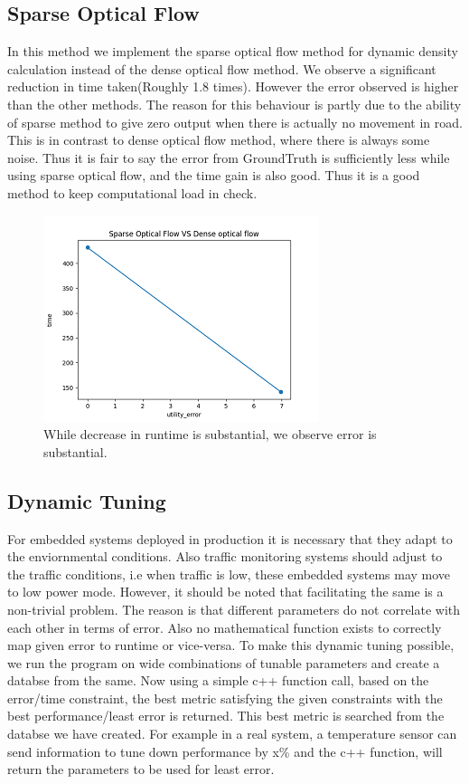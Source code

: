 \documentclass[conference]{IEEEtran}
\begin{document}
\subsection{Sparse Optical Flow}

In this method we implement the sparse optical flow method for dynamic density calculation instead of the dense optical flow method.
We observe a significant reduction in time taken(Roughly 1.8 times). However the error observed is higher than the other methods.
The reason for this behaviour is partly due to the ability of sparse method to give zero output when there is actually no movement in road. This is in contrast to dense optical flow method,
where there is always some noise. Thus it is fair to say the error from GroundTruth is sufficiently less while using sparse optical flow, and the time gain is also good. Thus it is a good method to keep computational load in check.

\begin{figure}[htbp]
\centerline{\includegraphics{plots/plot_sparse_optical_eVt.png}}
\caption{While decrease in runtime is substantial, we observe error is substantial.}
\label{sof_pvt} 
\end{figure}

\subsection{Dynamic Tuning}

For embedded systems deployed in production it is necessary that they adapt to the enviornmental conditions. Also traffic monitoring systems should adjust to the traffic conditions,
i.e when traffic is low, these embedded systems may move to low power mode. 
However, it should be noted that facilitating the same is a non-trivial problem. The reason is that different parameters do not correlate with each other in terms of error. Also no mathematical function exists to correctly map given error to runtime or vice-versa.
To make this dynamic tuning possible, we run the program on wide combinations of tunable parameters and create a databse from the same.
Now using a simple c++ function call, based on the error/time constraint, the best metric satisfying the given constraints with the best performance/least error is returned. This best metric is searched from the databse we have created. For example in a real system, a temperature sensor can send information to tune down performance by x\% and 
the c++ function, will return the parameters to be used for least error.
\end{document}
